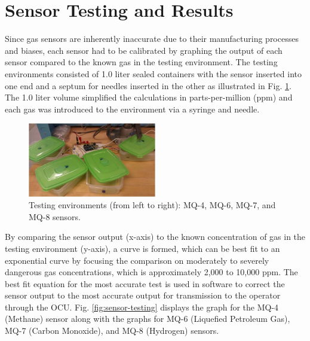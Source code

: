 \section{Sensor Testing and Results}\label{sec:results}

Since gas sensors are inherently inaccurate due to their manufacturing processes and biases, each sensor had to be calibrated by graphing the output of each sensor compared to the known gas in the testing environment. The testing environments consisted of 1.0 liter sealed containers with the sensor inserted into one end and a septum for needles inserted in the other as illustrated in Fig. \ref{fig:sensor}. The 1.0 liter volume simplified the calculations in parts-per-million (ppm) and each gas was introduced to the environment via a syringe and needle.

\begin{figure}
	\centering
	\includegraphics[width=0.5\textwidth]{./pictures/sensor.jpg}
	\caption{Testing environments (from left to right): MQ-4, MQ-6, MQ-7, and MQ-8 sensors.}
	\label{fig:sensor}
\end{figure}

By comparing the sensor output (x-axis) to the known concentration of gas in the testing environment (y-axis), a curve is formed, which can be best fit to an exponential curve by focusing the comparison on moderately to severely dangerous gas concentrations, which is approximately 2,000 to 10,000 ppm. The best fit equation for the most accurate test is used in software to correct the sensor output to the most accurate output for transmission to the operator through the OCU. Fig. \ref{fig:sensor-testing} displays the graph for the MQ-4 (Methane) sensor along with the graphs for MQ-6 (Liquefied Petroleum Gas), MQ-7 (Carbon Monoxide), and MQ-8 (Hydrogen) sensors.

